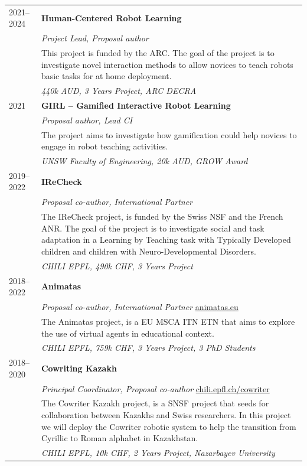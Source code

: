 \begin{longtable}{@{}lp{\dimexpr\textwidth-2.8cm\relax}@{}}
2021--2024 & \textbf{Human-Centered Robot Learning} \\
           & \emph{Project Lead, Proposal author} \\
           & This project is funded by the ARC. The goal of the project is to investigate novel interaction methods to allow novices to teach robots basic tasks for at home deployment. \\
           & \textit{440k AUD, 3 Years Project, ARC DECRA} \\[3pt]

2021       & \textbf{GIRL -- Gamified Interactive Robot Learning} \\
           & \emph{Proposal author, Lead CI} \\
           & The project aims to investigate how gamification could help novices to engage in robot teaching activities. \\
           & \textit{UNSW Faculty of Engineering, 20k AUD, GROW Award} \\[3pt]

2019--2022 & \textbf{IReCheck} \\
           & \emph{Proposal co-author, International Partner} \\
           & The IReCheck project, is funded by the Swiss NSF and the French ANR. The goal of the project is to investigate social and task adaptation in a Learning by Teaching task with Typically Developed children and children with Neuro-Developmental Disorders. \\
           & \textit{CHILI EPFL, 490k CHF, 3 Years Project} \\[3pt]

2018--2022 & \textbf{Animatas} \\
           & \emph{Proposal co-author, International Partner} \quad \href{http://animatas.eu}{animatas.eu} \\
           & The Animatas project, is a EU MSCA ITN ETN that aims to explore the use of virtual agents in educational context. \\
           & \textit{CHILI EPFL, 759k CHF, 3 Years Project, 3 PhD Students} \\[3pt]

2018--2020 & \textbf{Cowriting Kazakh} \\
           & \emph{Principal Coordinator, Proposal co-author} \quad \href{https://chili.epfl.ch/cowriter}{chili.epfl.ch/cowriter} \\
           & The Cowriter Kazakh project, is a SNSF project that seeds for collaboration between Kazakhs and Swiss researchers. In this project we will deploy the Cowriter robotic system to help the transition from Cyrillic to Roman alphabet in Kazakhstan. \\
           & \textit{CHILI EPFL, 10k CHF, 2 Years Project, Nazarbayev University} \\[3pt]


\end{longtable}
